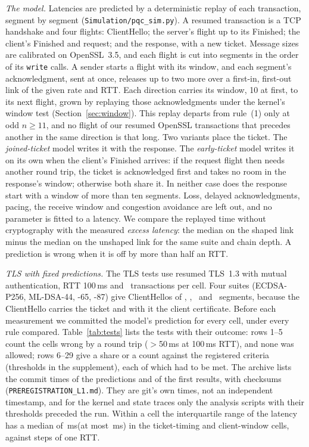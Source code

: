 \documentclass[sigconf,9pt,nonacm]{acmart}
\newcommand{\ms}{\,ms\xspace}
\begin{document}
\emph{The model.} Latencies are predicted by a deterministic replay of each transaction, segment by segment (\texttt{Simulation/pqc\_sim.py}). A resumed transaction is a TCP handshake and four flights: ClientHello; the server's flight up to its Finished; the client's Finished and request; and the response, with a new ticket. Message sizes are calibrated on OpenSSL~3.5, and each flight is cut into segments in the order of its \texttt{write} calls. A sender starts a flight with its window, and each segment's acknowledgment, sent at once, releases up to two more over a first-in, first-out link of the given rate and RTT. Each direction carries its window, 10 at first, to its next flight, grown by replaying those acknowledgments under the kernel's window test (Section~\ref{sec:window}). This replay departs from rule~(1) only at odd $n\ge 11$, and no flight of our resumed OpenSSL transactions that precedes another in the same direction is that long. Two variants place the ticket. The \emph{joined-ticket} model writes it with the response. The \emph{early-ticket} model writes it on its own when the client's Finished arrives: if the request flight then needs another round trip, the ticket is acknowledged first and takes no room in the response's window; otherwise both share it. In neither case does the response start with a window of more than ten segments. Loss, delayed acknowledgments, pacing, the receive window and congestion avoidance are left out, and no parameter is fitted to a latency. We compare the replayed time without cryptography with the measured \emph{excess latency}: the median on the shaped link minus the median on the unshaped link for the same suite and chain depth. A prediction is wrong when it is off by more than half an RTT.

\emph{TLS with fixed predictions.} The TLS tests use resumed TLS~1.3 with mutual authentication, RTT 100\ms and \NPerCell\ transactions per cell. Four suites (ECDSA-P256, ML-DSA-44, -65, -87) give ClientHellos of \ChSegEc, \ChSegMlFourFour, \ChSegMlSixFive\ and \ChSegMlEightSeven\ segments, because the ClientHello carries the ticket and with it the client certificate. Before each measurement we committed the model's prediction for every cell, under every rule compared. Table~\ref{tab:tests} lists the tests with their outcome: rows 1--5 count the cells wrong by a round trip ($>$50\ms at 100\ms RTT), and none was allowed; rows 6--29 give a share or a count against the registered criteria (thresholds in the supplement), each of which had to be met. The archive lists the commit times of the predictions and of the first results, with checksums (\texttt{PREREGISTRATION\_L1.md}). They are git's own times, not an independent timestamp, and for the kernel and state traces only the analysis scripts with their thresholds preceded the run. Within a cell the interquartile range of the latency has a median of \SpreadMed\ms (at most \SpreadMax\ms) in the ticket-timing and client-window cells, against steps of one RTT.
\end{document}
